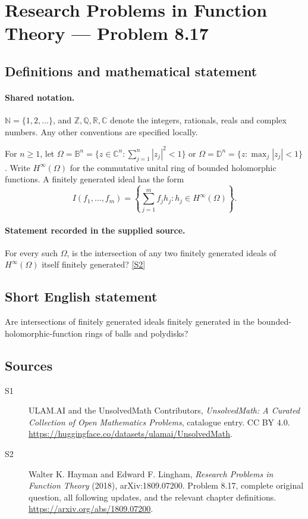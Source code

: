 \documentclass[11pt]{book}
\newcommand{\sref}[2]{\hyperlink{source:#1:#2}{[S#2]}}
\begin{document}
\section{Research Problems in Function Theory — Problem 8.17}\label{statement}

\subsection{Definitions and mathematical statement}

\paragraph{Shared notation.}$\mathbb N=\{1,2,\ldots\}$, and $\mathbb Z,\mathbb Q,\mathbb R,\mathbb C$ denote the integers, rationals, reals and complex numbers. Any other conventions are specified locally.


For $n\ge1$, let $\Omega=\mathbb B^n=\{z\in\mathbb C^n:\sum_{j=1}^n|z_j|^2<1\}$ or $\Omega=\mathbb D^n=\{z:\max_j|z_j|<1\}$. Write $H^{\infty}(\Omega)$ for the commutative unital ring of bounded holomorphic functions. A finitely generated ideal has the form \[I(f_1,\ldots,f_m)=\left\{\sum_{j=1}^mf_jh_j:h_j\in H^{\infty}(\Omega)\right\}.\]
\paragraph{Statement recorded in the supplied source.}
For every such $\Omega$, is the intersection of any two finitely generated ideals of $H^{\infty}(\Omega)$ itself finitely generated? \sref{statement}{2}
\subsection{Short English statement}
Are intersections of finitely generated ideals finitely generated in the bounded-holomorphic-function rings of balls and polydisks?
\subsection{Sources}
\begin{description}
\item[\hypertarget{source:statement:1}{S1}] ULAM.AI and the UnsolvedMath Contributors, \emph{UnsolvedMath: A Curated Collection of Open Mathematics Problems}, catalogue entry. CC BY 4.0. \url{https://huggingface.co/datasets/ulamai/UnsolvedMath}.
\item[\hypertarget{source:statement:2}{S2}] Walter K. Hayman and Edward F. Lingham, \emph{Research Problems in Function Theory} (2018), arXiv:1809.07200. Problem 8.17, complete original question, all following updates, and the relevant chapter definitions. \url{https://arxiv.org/abs/1809.07200}.
\end{description}
\label{end:statement}
\end{document}
